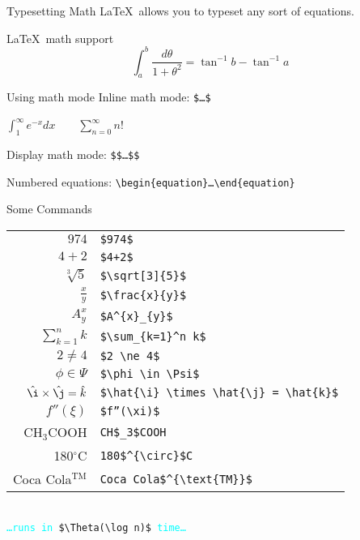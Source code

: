 
\begin{frame}{Typesetting Math}
\LaTeX~allows you to typeset any sort of equations.
\begin{block}{\LaTeX~math support}
$$\int_a^b\frac{d\theta}{1+\theta^2} = \tan^{-1}b - \tan^{-1}a$$
\end{block}
\begin{block}{Using math mode}
Inline math mode: \texttt{\$\ldots\$}
\begin{center}
$\int_1^\infty e^{-x} dx$~~~~$\sum_{n=0}^\infty n!$
\end{center}

Display math mode: \texttt{\$\$\ldots\$\$}

Numbered equations: \texttt{\small \textbackslash begin\{equation\}\ldots\textbackslash end\{equation\}}
\end{block}
\end{frame}

\begin{frame}{Some Commands}
\begin{center}
\begin{tabular}{rl}
$974$ & \texttt{\$974\$} \\
$4+2$ & \texttt{\$4+2\$} \\
$\sqrt[3]{5}$ & \texttt{\$\textbackslash sqrt[3]\{5\}\$} \\
$\frac{x}{y}$ & \texttt{\$\textbackslash frac\{x\}\{y\}\$} \\
$A^{x}_{y}$ & \texttt{\$A\^{}\{x\}\_\{y\}\$} \\
$\sum_{k=1}^n k$ & \texttt{\$\textbackslash sum\_\{k=1\}\^{}n k\$} \\
$2 \ne 4$ & \texttt{\$2 \textbackslash ne 4\$} \\
$\phi \in \Psi$ & \texttt{\$\textbackslash phi \textbackslash in \textbackslash Psi\$} \\
$\hat{\i}\times\hat{\j}=\hat{k}$ & \texttt{\$\textbackslash hat\{\textbackslash i\} \textbackslash times \textbackslash hat\{\textbackslash j\} = \textbackslash hat\{k\}\$} \\
$f''(\xi)$ & \texttt{\$f''(\textbackslash xi)\$} \\
CH$_3$COOH & \texttt{CH\$\_3\$COOH} \\
180$^{\circ}$C & \texttt{180\$\^{}\{\textbackslash circ\}\$C} \\
Coca Cola$^{\text{TM}}$ & \texttt{Coca Cola\$\^{}\{\textbackslash text\{TM\}\}\$} \\
\end{tabular}


~\\

\texttt{\textcolor{cyan}{\ldots runs in} \$\textbackslash Theta(\textbackslash log n)\$ \textcolor{cyan}{time\ldots}}
\end{center}
\end{frame}

